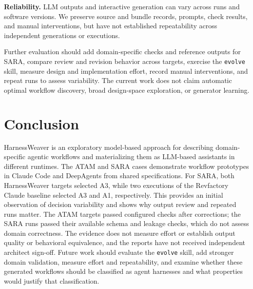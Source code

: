 \documentclass[10pt,conference]{IEEEtran}
\begin{document}
\textbf{Reliability.} LLM outputs and interactive generation can vary across runs and software versions. We preserve source and bundle records, prompts, check results, and manual interventions, but have not established repeatability across independent generations or executions.

Further evaluation should add domain-specific checks and reference outputs for SARA, compare review and revision behavior across targets, exercise the \texttt{evolve} skill, measure design and implementation effort, record manual interventions, and repeat runs to assess variability. The current work does not claim automatic optimal workflow discovery, broad design-space exploration, or generator learning.

\section{Conclusion}

HarnessWeaver is an exploratory model-based approach for describing domain-specific agentic workflows and materializing them as LLM-based assistants in different runtimes. The ATAM and SARA cases demonstrate workflow prototypes in Claude Code and DeepAgents from shared specifications. For SARA, both HarnessWeaver targets selected A3, while two executions of the Revfactory Claude baseline selected A3 and A1, respectively. This provides an initial observation of decision variability and shows why output review and repeated runs matter. The ATAM targets passed configured checks after corrections; the SARA runs passed their available schema and leakage checks, which do not assess domain correctness. The evidence does not measure effort or establish output quality or behavioral equivalence, and the reports have not received independent architect sign-off. Future work should evaluate the \texttt{evolve} skill, add stronger domain validation, measure effort and repeatability, and examine whether these generated workflows should be classified as agent harnesses and what properties would justify that classification.

\balance


\end{document}

